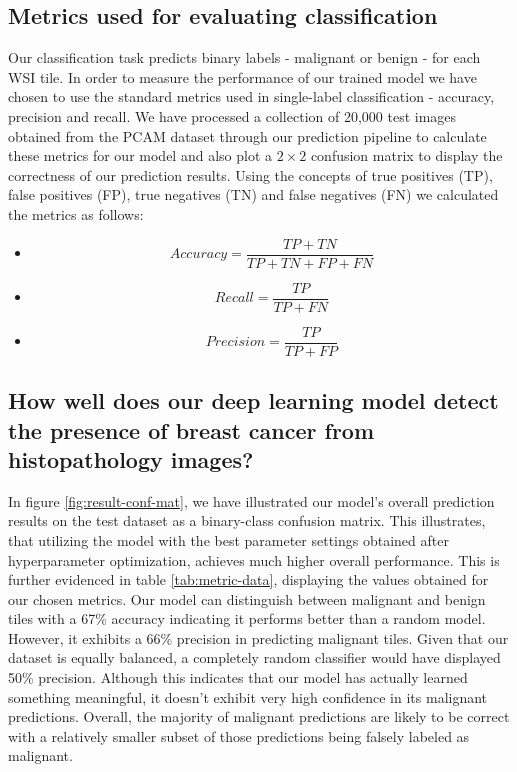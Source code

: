 \documentclass{l4proj}
\begin{document}
\subsection{Metrics used for evaluating classification}
Our classification task predicts binary labels - malignant or benign - for each WSI tile. In order to measure the performance of our trained model we have chosen to use the standard metrics used in single-label classification - accuracy, precision and recall. We have processed a collection of 20,000 test images obtained from the PCAM dataset through our prediction pipeline to calculate these metrics for our model and also plot a \(2 \times 2\) confusion matrix to display the correctness of our prediction results. Using the concepts of true positives (TP), false positives (FP), true negatives (TN) and false negatives (FN) we calculated the metrics as follows:
\begin{itemize}
    \item[] \begin{equation}
        Accuracy = \frac{TP + TN}{TP + TN + FP + FN}
    \end{equation}

    \item[] \begin{equation}
        Recall = \frac{TP}{TP + FN}
    \end{equation}

    \item[] \begin{equation}
        Precision = \frac{TP}{TP + FP}
    \end{equation}
\end{itemize}

\subsection{How well does our deep learning model detect the presence of breast cancer from histopathology images?}
In figure \ref{fig:result-conf-mat}, we have illustrated our model's overall prediction results on the test dataset as a binary-class confusion matrix. This illustrates, that utilizing the model with the best parameter settings obtained after hyperparameter optimization, achieves much higher overall performance. This is further evidenced in table \ref{tab:metric-data}, displaying the values obtained for our chosen metrics. Our model can distinguish between malignant and benign tiles with a 67\% accuracy indicating it  performs better than a random model. However, it exhibits a 66\% precision in predicting malignant tiles. Given that our dataset is equally balanced, a completely random classifier would have displayed 50\% precision. Although this indicates that our model has actually learned something meaningful, it doesn't exhibit very high confidence in its malignant predictions. Overall, the majority of malignant predictions are likely to be correct with a relatively smaller subset of those predictions being falsely labeled as malignant.
\end{document}
